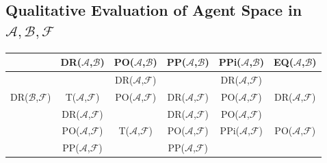 \documentclass[conference]{IEEEtran}
\newcommand{\assertionRegion}{\mathcal{A}}
\newcommand{\beliefRegion}{\mathcal{B}}
\newcommand{\factRegion}{\mathcal{F}}
\newcommand{\abf}{\assertionRegion,\beliefRegion,\factRegion}
\newcommand{\eq}[2]{EQ(#1,#2)}
\newcommand{\pp}[2]{PP(#1,#2)}
\newcommand{\po}[2]{PO(#1,#2)}
\newcommand{\ppi}[2]{PPi(#1,#2)}
\newcommand{\dr}[2]{DR(#1,#2)}
\newcommand{\all}[2]{T(#1,#2)}
\begin{document}
\subsection{Qualitative Evaluation of Agent Space in $\abf$}\label{sec:agentspace}
\begin{table}[t]
\centering
\begin{adjustbox}{width=\columnwidth}
\begin{tabular}{r||c|c|c|c|c} 
& \dr{$\assertionRegion$}{$\beliefRegion$} & 
	\po{$\assertionRegion$}{$\beliefRegion$}& 
	\pp{$\assertionRegion$}{$\beliefRegion$} &
	\ppi{$\assertionRegion$}{$\beliefRegion$} & 
	\eq{$\assertionRegion$}{$\beliefRegion$} \\
\hline
\hline %
 \multirow{3}{*}{\dr{$\beliefRegion$}{$\factRegion$}} & 
	\cellcolor{abfred} & %
	\cellcolor{abf-rg-1}\dr{$\assertionRegion$}{$\factRegion$} & %
	\cellcolor{abf-rg-2}\multirow{3}{*}{\dr{$\assertionRegion$}{$\factRegion$}} & %
	\cellcolor{abf-rg-3} \dr{$\assertionRegion$}{$\factRegion$}& %
	 \cellcolor{abf-rg-4} \\ %
& \cellcolor{abfred}\all{$\assertionRegion$}{$\factRegion$}& %
	\cellcolor{abf-rg-1}\po{$\assertionRegion$}{$\factRegion$} & %
	\cellcolor{abf-rg-2}\dr{$\assertionRegion$}{$\factRegion$} & %
	\cellcolor{abf-rg-3}\po{$\assertionRegion$}{$\factRegion$} & %
	\cellcolor{abf-rg-4}\dr{$\assertionRegion$}{$\factRegion$}\\ %
\hline %
 \multirow{3}{*}{\po{$\beliefRegion$}{$\factRegion$}} &
	\cellcolor{abf-rg-1}\dr{$\assertionRegion$}{$\factRegion$} & %
	\cellcolor{abf-rg-2} & %
	\cellcolor{abf-rg-3}\dr{$\assertionRegion$}{$\factRegion$} & %
	\cellcolor{abf-rg-4}\po{$\assertionRegion$}{$\factRegion$} & %
	\cellcolor{abf-rg-5} \\ %
 & \cellcolor{abf-rg-1}\po{$\assertionRegion$}{$\factRegion$} & %
	\cellcolor{abf-rg-2} \all{$\assertionRegion$}{$\factRegion$} & %
	\cellcolor{abf-rg-3}\po{$\assertionRegion$}{$\factRegion$} & %
	\cellcolor{abf-rg-4}\ppi{$\assertionRegion$}{$\factRegion$} & %
	\cellcolor{abf-rg-5} \po{$\assertionRegion$}{$\factRegion$}\\%
 & \cellcolor{abf-rg-1}\pp{$\assertionRegion$}{$\factRegion$} & %
	\cellcolor{abf-rg-2} &  %
	\cellcolor{abf-rg-3}\pp{$\assertionRegion$}{$\factRegion$} & %

\end{tabular}
\end{adjustbox}
\end{table}
\end{document}
